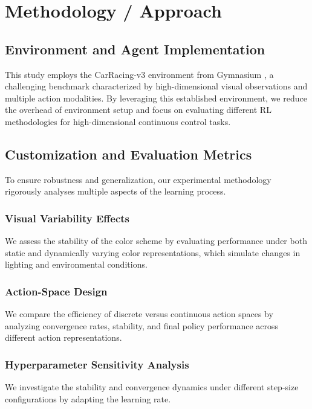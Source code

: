 \documentclass[../CSC_52081_EP.tex]{subfiles}
\begin{document}
\section{Methodology / Approach}


\subsection{Environment and Agent Implementation}
This study employs the CarRacing-v3 environment from Gymnasium \cite{gymnasium}, a challenging benchmark characterized by high-dimensional visual observations and multiple action modalities. By leveraging this established environment, we reduce the overhead of environment setup and focus on evaluating different RL methodologies for high-dimensional continuous control tasks.

\subsection{Customization and Evaluation Metrics}
To ensure robustness and generalization, our experimental methodology rigorously analyses multiple aspects of the learning process.

\subsubsection{Visual Variability Effects}
We assess the stability of the color scheme by evaluating performance under both static and dynamically varying color representations, which simulate changes in lighting and environmental conditions.

\subsubsection{Action-Space Design}
We compare the efficiency of discrete versus continuous action spaces by analyzing convergence rates, stability, and final policy performance across different action representations.

\subsubsection{Hyperparameter Sensitivity Analysis}
We investigate the stability and convergence dynamics under different step-size configurations by adapting the learning rate.
\end{document}
